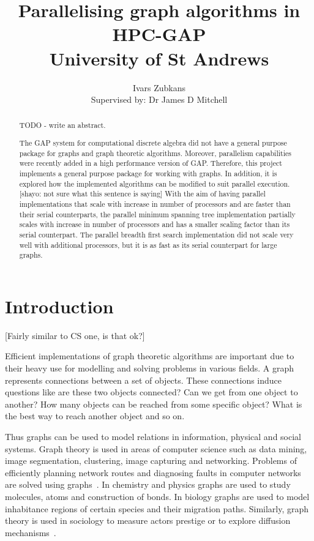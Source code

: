 \documentclass{report}
\title{Parallelising graph algorithms in HPC-GAP \\ \vspace{2 mm} {\large University of St Andrews}}
\author{Ivars Zubkans \\ \small Supervised by: Dr James D Mitchell}
\theoremstyle{plain}
\theoremstyle{definition}
\theoremstyle{remark}
\numberwithin{definition}{chapter}
\numberwithin{example}{chapter}
\numberwithin{figure}{chapter}
\numberwithin{theorem}{chapter}
\numberwithin{lemma}{chapter}
\begin{document}
\maketitle

\begin{abstract}

TODO - write an abstract.

The GAP system for computational discrete algebra did not have a general purpose package for graphs and graph theoretic algorithms. Moreover, parallelism capabilities were recently added in a high performance version of GAP. Therefore, this project implements a general purpose package for working with graphs. In addition, it is explored how the implemented algorithms can be modified to suit parallel execution.[shayo: not sure what this sentence is saying] With the aim of having parallel implementations that scale with increase in number of processors and are faster than their serial counterparts, the parallel minimum spanning tree implementation partially scales with increase in number of processors and has a smaller scaling factor than its serial counterpart. The parallel breadth first search implementation did not scale very well with additional processors, but it is as fast as its serial counterpart for large graphs.

\end{abstract}

\tableofcontents

\chapter{Introduction}

[Fairly similar to CS one, is that ok?]

Efficient implementations of graph theoretic algorithms are important due to their heavy use for modelling and solving problems in various fields. A graph represents connections between a set of objects. These connections induce questions like are these two objects connected? Can we get from one object to another? How many objects can be reached from some specific object? What is the best way to reach another object and so on.

Thus graphs can be used to model relations in information, physical and social systems. Graph theory is used in areas of computer science such as data mining, image segmentation, clustering, image capturing and networking. Problems of efficiently planning network routes and diagnosing faults in computer networks are solved using graphs~\cite{6005872}. In chemistry and physics graphs are used to study molecules, atoms and construction of bonds. In biology graphs are used to model inhabitance regions of certain species and their migration paths. Similarly, graph theory is used in sociology to measure actors prestige or to explore diffusion mechanisms~\cite{shirinivas2010applications}.
\end{document}
